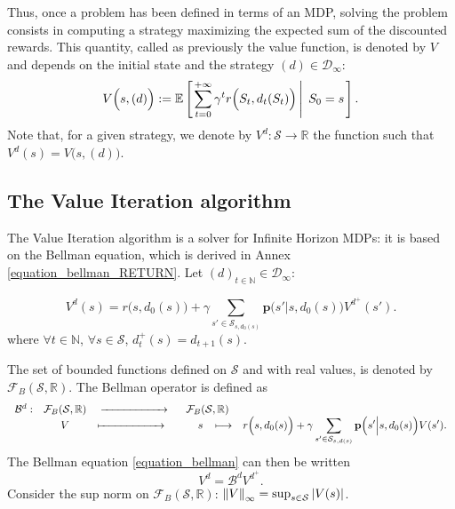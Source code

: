Thus, once a problem has been defined in terms of an MDP,
solving the problem consists in computing a strategy
maximizing the expected sum of the discounted rewards.
This quantity, called as previously the value function,
is denoted by $V$ and depends on the initial state 
and the strategy $(d) \in \mathcal{D}_{\infty}$:
\begin{equation} \label{fctV} 
V\Big(s,(d)\Big) := \mathbb{E} \left[ \left.  \sum_{t=0}^{+\infty} \gamma^{t} r\Big(S_{t},d_t(S_{t})\Big) \, \right| \left. \, S_0=s \right. \right].
\end{equation}
Note that, for a given strategy, 
we denote by $V^d: \mathcal{S} \rightarrow \mathbb{R}$
the function such that $V^d(s)=V\Big(s,(d)\Big)$.
\subsection{The Value Iteration algorithm} \label{resMDP}
The Value Iteration algorithm is a solver for Infinite Horizon MDPs:
it is based on the Bellman equation,
which is derived in Annex \ref{equation_bellman_RETURN}. 
Let $(d)_{t \in \mathbb{N}} \in \mathcal{D}_{\infty}$:
\begin{Def}
\begin{equation}
\label{equation_bellman} V^{d}(s) = r\Big(s,d_0(s)\Big) + \gamma \sum_{s' \in \mathcal{S}_{s,d_0(s)}} \textbf{p} \Big( s' \Big\vert s,d_0(s) \Big) V^{d^+}(s').
\end{equation}
where $\forall t \in \mathbb{N}$, 
$\forall s \in \mathcal{S}$,
$d^+_t(s) = d_{t+1}(s)$. 
\end{Def}

The set of bounded functions defined on $\mathcal{S}$ 
and with real values, is denoted by
$\mathcal{F}_{B}(\mathcal{S},\mathbb{R})$.
The Bellman operator is defined as 
\[ \left. \begin{array}{ccccc}
 \mathcal{B}^d: & \mathcal{F}_{B}(\mathcal{S},\mathbb{R}) & \xrightarrow{\hspace*{2cm}} \hspace{0.5cm} \mathcal{F}_{B}(\mathcal{S},\mathbb{R}) & \\
& V & \xmapsto{\hspace*{2cm}} \hspace{1cm}  s \hspace{0.3cm} \longmapsto &  r\Big(s,d_0(s)\Big) + \displaystyle  \gamma  \sum_{s' \in \mathcal{S}_{s,d(s)}}  \textbf{p} \Big( s' \Big\vert s,d_0(s) \Big)  V(s').
\end{array} \right.\] 
The Bellman equation \ref{equation_bellman} can then be written 
\begin{equation}
\label{bellman_equation}
V^d = \mathcal{B}^dV^{d^+}.
\end{equation}
Consider the sup norm on $\mathcal{F}_{B}(\mathcal{S},\mathbb{R})$: 
$\left\lVert V \right\rVert_{\infty} = \sup_{s \in \mathcal{S}} \left\lvert  V(s)  \right\rvert$.

